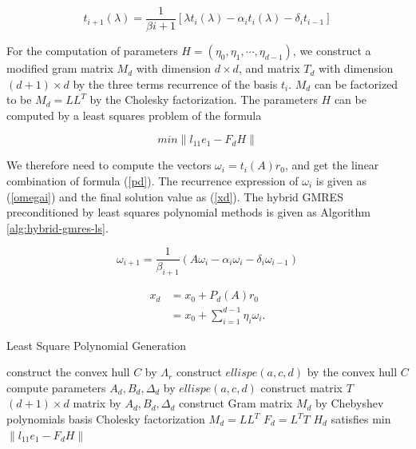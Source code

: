\begin{equation}
\label{threeterms}
t_{i+1}(\lambda)=\frac{1}{\beta i+1}[\lambda t_i(\lambda)-\alpha_i t_i(\lambda)-\delta_i t_{i-1}]
\end{equation}

For the computation of parameters $H=(\eta_0,\eta_1,\cdots,\eta_{d-1})$, we construct a modified gram matrix $M_d$ with dimension $d \times d$, and matrix $T_d$ with dimension $(d+1) \times d$ by the three terms recurrence of the basis $t_i$. $M_d$ can be factorized to be $M_d=LL^T$ by the Cholesky factorization. The parameters $H$ can be computed by a least squares problem of the formula


\begin{equation}
\label{eq112}
min \|l_{11}e_1-F_d H\|
\end{equation}

We therefore need to compute the vectors \(\omega_i=t_i(A)r_0\), and get the linear combination of formula (\ref{pd}). The recurrence expression of $ \omega_i$ is given as (\ref{omegai}) and the final solution value as (\ref{xd}). The hybrid GMRES preconditioned by least squares polynomial methods is given as Algorithm \ref{alg:hybrid-gmres-ls}.

\begin{equation}
\label{omegai}
\omega_{i+1}=\frac{1}{\beta_{i+1}}(A\omega_i-\alpha_i\omega_i-\delta_i\omega_{i-1})
\end{equation}

\begin{equation}
\begin{aligned}
\label{xd}
x_d &=x_0+P_d(A)r_0 \\ &=x_0+\sum_{i=1}^{d-1}\eta_i\omega_i.
\end{aligned}
\end{equation}

\begin{algorithm}[htbp]
	\caption{Least Square Polynomial Generation}
	\label{alg:lsqr-parameters}
	\begin{algorithmic}[1]
		\State construct the convex hull $C$ by $\Lambda_r$
		\State construct $ellispe(a,c,d)$ by the convex hull $C$
		\State compute parameters $A_d, B_d, \Delta_d$ by $ellispe(a,c,d)$
		\State construct matrix $T$ ${(d+1)} \times d$ matrix by $A_d, B_d, \Delta_d$
		\State construct Gram matrix $M_d$ by Chebyshev polynomials basis
		\State Cholesky factorization $M_d=LL^T$
		\State $F_d=L^TT$
		\State $H_d$ satisfies min $\|l_{11}e_1-F_d H\|$
		\EndFunction
	\end{algorithmic}
\end{algorithm}

